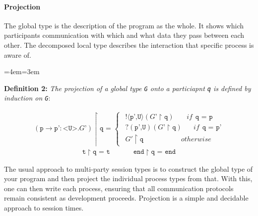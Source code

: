 \documentclass[11pt, abstracton, twoside, titlepage=true]{scrartcl}
\newenvironment{blockquote}{
	\par
	\medskip
	\leftskip=4em\rightskip=3em
	\noindent\ignorespaces
}{
	\par\medskip
}
\begin{document}
\paragraph{Projection}
The global type is the description of the program as the whole. It shows which 
participants communication with which and what data they pass between each other. 
The decomposed local type describes the interaction that specific process is aware 
of.

\begin{blockquote}
  \textbf{Definition 2:} \emph{The projection of a global type \texttt{G} onto 
  a particiapnt \texttt{q} is defined by induction on \texttt{G}}:
\end{blockquote}
\begin{align*}
  (\texttt{p} \rightarrow \texttt{p'}:\texttt{<U>}.\texttt{$G$'}) \upharpoonright \texttt{q = }  
  \begin{cases}
\hspace{5pt} !\langle \texttt{p',U} \rangle (\texttt{$G$'}\upharpoonright \texttt{q}) \hspace{22pt}if \hspace{5pt} \texttt{q = p} \\
\hspace{5pt} ?(\texttt{p',U}) (\texttt{$G$'}\upharpoonright \texttt{q}) \hspace{20pt}if \hspace{5pt} \texttt{q = p'} \\
\hspace{5pt} \texttt{$G'$}\upharpoonright \texttt{q} \hspace{65pt} otherwise
  \end{cases}
\end{align*}
\begin{align*}
  \texttt{t} \upharpoonright \texttt{q = t} 
  \hspace{40pt} \texttt{end} \upharpoonright \texttt{q = end}
\end{align*}

The usual approach to multi-party 
session types is to construct the global type of your program and then project the 
individual process types from that. With this, one can then write each process, 
ensuring that all communication protocols remain consistent as development proceeds. 
Projection is a simple and decidable approach to session times.
\end{document}
